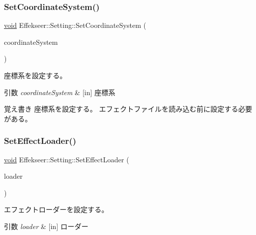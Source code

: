 \subsubsection{\texorpdfstring{Set\+Coordinate\+System()}{SetCoordinateSystem()}}
{\footnotesize\ttfamily \mbox{\hyperlink{namespace_effekseer_ab34c4088e512200cf4c2716f168deb56}{void}} Effekseer\+::\+Setting\+::\+Set\+Coordinate\+System (\begin{DoxyParamCaption}\item[{\mbox{\hyperlink{namespace_effekseer_ac8508f8823c5fcf36aac5d2ddee23765}{Coordinate\+System}}}]{coordinate\+System }\end{DoxyParamCaption})}



座標系を設定する。 


\begin{DoxyParams}{引数}
{\em coordinate\+System} & \mbox{[}in\mbox{]} 座標系 \\
\hline
\end{DoxyParams}
\begin{DoxyNote}{覚え書き}
座標系を設定する。 エフェクトファイルを読み込む前に設定する必要がある。 
\end{DoxyNote}
\mbox{\label{class_effekseer_1_1_setting_acc38b8b4013c440242f1bba9a9696639}} 
\subsubsection{\texorpdfstring{Set\+Effect\+Loader()}{SetEffectLoader()}}
{\footnotesize\ttfamily \mbox{\hyperlink{namespace_effekseer_ab34c4088e512200cf4c2716f168deb56}{void}} Effekseer\+::\+Setting\+::\+Set\+Effect\+Loader (\begin{DoxyParamCaption}\item[{\mbox{\hyperlink{class_effekseer_1_1_effect_loader}{Effect\+Loader}} $\ast$}]{loader }\end{DoxyParamCaption})}



エフェクトローダーを設定する。 


\begin{DoxyParams}{引数}
{\em loader} & \mbox{[}in\mbox{]} ローダー \\
\hline
\end{DoxyParams}
\mbox{\label{class_effekseer_1_1_setting_a98982ad75809cd84b95865fc58fbd325}} 

